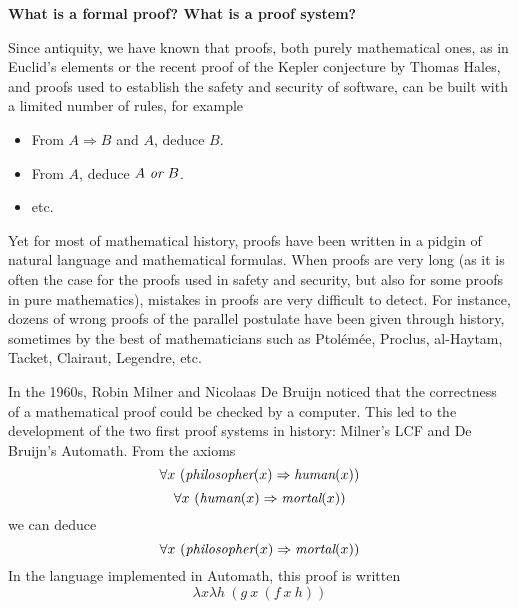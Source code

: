 \pagebreak
\begin{framed}
  \begin{center}
    {\bf \Large What is a formal proof? What is a proof system?}
    \end{center}

Since antiquity, we have known that
proofs, both purely mathematical ones, as in Euclid's elements or the
recent proof of the Kepler conjecture by Thomas Hales, and proofs used
to establish the safety and security of software, can be built with a
limited number of rules, for example
\begin{itemize}
\item From $A \Rightarrow B$ and $A$, deduce $B$.
\item From $A$, deduce $A~\mbox{\it or}~B$.
\item etc.
\end{itemize}
Yet for most of mathematical history, proofs have been written in
a pidgin of natural language and mathematical formulas. When proofs are
very long (as it is often the case for the proofs used in safety and security,
but also for some proofs in pure mathematics), mistakes in proofs are
very difficult to detect. For instance, dozens of wrong proofs of
the parallel postulate have been given through history, sometimes by the
best of mathematicians such as Ptolémée, Proclus, al-Haytam, Tacket,
Clairaut, Legendre, etc.

In the 1960s, Robin Milner and Nicolaas De Bruijn noticed that the
correctness of a mathematical proof could be checked by a
computer. This led to the development of the two first proof systems
in history: Milner's LCF and De Bruijn's Automath.  From
the axioms
$$\forall x~(\mbox{\em philosopher}(x) \Rightarrow \mbox{\em human}(x))$$
$$\forall x~(\mbox{\em human}(x) \Rightarrow \mbox{\em mortal}(x))$$
we can deduce
$$\forall x~(\mbox{\em philosopher}(x) \Rightarrow \mbox{\em mortal}(x))$$
In the language implemented in Automath, this proof is written
$$\lambda x \lambda h~(g~x~(f~x~h))$$
\end{framed}

